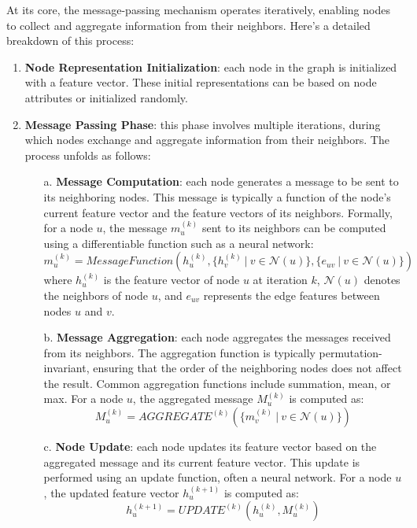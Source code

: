 At its core, the message-passing mechanism operates iteratively, enabling nodes to collect and aggregate information from their neighbors.
Here's a detailed breakdown of this process:
\begin{enumerate}
    \item \textbf{Node Representation Initialization}: each node in the graph is initialized with a feature vector. These initial representations can be based on node attributes or initialized randomly.

    \item \textbf{Message Passing Phase}: this phase involves multiple iterations, during which nodes exchange and aggregate information from their neighbors. The process unfolds as follows:
    \begin{itemize}
        \item[a.] \textbf{Message Computation}: each node generates a message to be sent to its neighboring nodes. This message is typically a function of the node's current feature vector and the feature vectors of its neighbors. Formally, for a node \(u\), the message \(m_{u}^{(k)}\) sent to its neighbors can be computed using a differentiable function such as a neural network:
        \[
        m_{u}^{(k)} = MessageFunction(h_u^{(k)}, \{h_v^{(k)}~|~v \in \mathcal{N}(u)\}, \{e_{uv}~|~v \in \mathcal{N}(u)\})
        \]
        where \(h_u^{(k)}\) is the feature vector of node \(u\) at iteration \(k\), \(\mathcal{N}(u)\) denotes the neighbors of node \(u\), and \(e_{uv}\) represents the edge features between nodes \(u\) and \(v\).
  
        \item[b.] \textbf{Message Aggregation}: each node aggregates the messages received from its neighbors. The aggregation function is typically permutation-invariant, ensuring that the order of the neighboring nodes does not affect the result. Common aggregation functions include summation, mean, or max. For a node \(u\), the aggregated message \(M_u^{(k)}\) is computed as:
        \[
        M_u^{(k)} = AGGREGATE^{(k)}(\{m_{v}^{(k)}~|~v \in \mathcal{N}(u)\})
        \]
  
        \item[c.] \textbf{Node Update}: each node updates its feature vector based on the aggregated message and its current feature vector. This update is performed using an update function, often a neural network. For a node \(u\), the updated feature vector \(h_u^{(k+1)}\) is computed as:
        \[
        h_u^{(k+1)} = UPDATE^{(k)}(h_u^{(k)}, M_u^{(k)})
        \]
    \end{itemize}


\end{enumerate}
